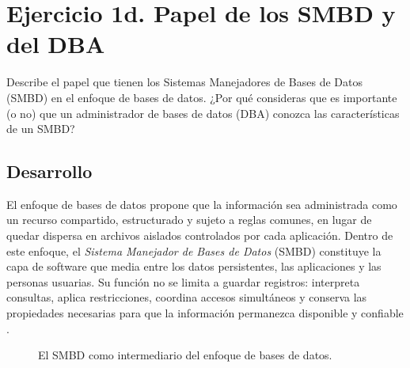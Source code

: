 
\section*{Ejercicio 1d. Papel de los SMBD y del DBA}

\begin{tcolorbox}[
  colback=lightgray,
  colframe=unamblue,
  title=Enunciado,
  fonttitle=\bfseries,
  boxrule=1pt,
  arc=2mm
]
Describe el papel que tienen los Sistemas Manejadores de Bases de Datos (SMBD)
en el enfoque de bases de datos. ¿Por qué consideras que es importante (o no)
que un administrador de bases de datos (DBA) conozca las características de un
SMBD?
\end{tcolorbox}

\subsection*{Desarrollo}

El enfoque de bases de datos propone que la información sea administrada como
un recurso compartido, estructurado y sujeto a reglas comunes, en lugar de
quedar dispersa en archivos aislados controlados por cada aplicación. Dentro de
este enfoque, el \textit{Sistema Manejador de Bases de Datos} (SMBD) constituye
la capa de software que media entre los datos persistentes, las aplicaciones y
las personas usuarias. Su función no se limita a guardar registros: interpreta
consultas, aplica restricciones, coordina accesos simultáneos y conserva las
propiedades necesarias para que la información permanezca disponible y
confiable \citep{dbconcepts}.

\begin{figure}[H]
  \centering
  \caption{El SMBD como intermediario del enfoque de bases de datos.}
  \label{fig:papel-smdb}
\end{figure}

